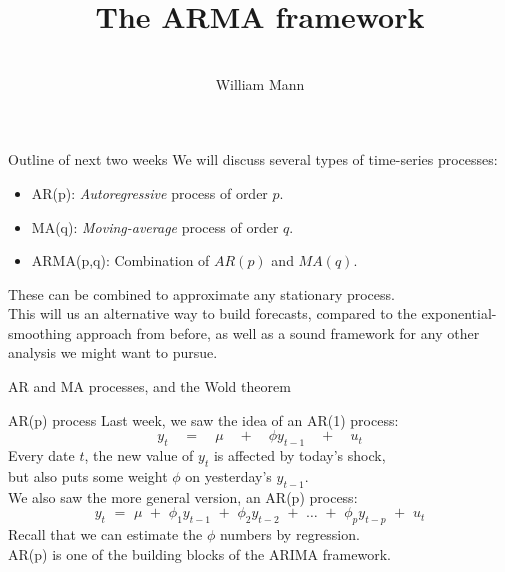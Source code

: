 \documentclass[t,12pt]{beamer}
\begin{document}
\title[The ARMA framework]{The ARMA framework}
\author{\vspace{0.35in} \\ {\selectfont William Mann} \vspace{-0.35in}}

\date{}
\maketitle

\begin{frame}[c]{Outline of next two weeks}
We will discuss several types of time-series processes:
\begin{itemize}
\smallskip
\item AR(p): \emph{Autoregressive} process of order $p$.
\item MA(q): \emph{Moving-average} process of order $q$.
\item ARMA(p,q): Combination of $AR(p)$ and $MA(q)$.
\end{itemize}
\bigskip
These can be combined to approximate any stationary process.
\\ \bigskip
This will us an alternative way to build forecasts, compared to the exponential-smoothing approach from before, 
as well as a sound framework for any other analysis we might want to pursue.
\end{frame}

\begin{frame}[c]
\vfill
\centerline{AR and MA processes, and the Wold theorem}
\vfill
\end{frame}

\begin{frame}[c]{AR(p) process}
Last week, we saw the idea of an AR(1) process:
$$
y_t \quad = \quad \mu \quad + \quad \phi y_{t-1} \quad + \quad u_t
$$
Every date $t$, the new value of $y_t$ is affected by today's shock, 
\\ but also puts some weight $\phi$ on yesterday's $y_{t-1}$.
\\ \bigskip
We also saw the more general version, an AR(p) process:
$$
y_t \,\, = \,\, \mu \,\, + \,\, \phi_1 y_{t-1} \,\, + \,\, \phi_2 y_{t-2} \,\, + \,\, \dots \,\, + \,\, \phi_p y_{t-p} \,\, + \,\, u_t
$$
Recall that we can estimate the $\phi$ numbers by regression.
\\ 
AR(p) is one of the building blocks of the ARIMA framework.
\end{frame}
\end{document}
